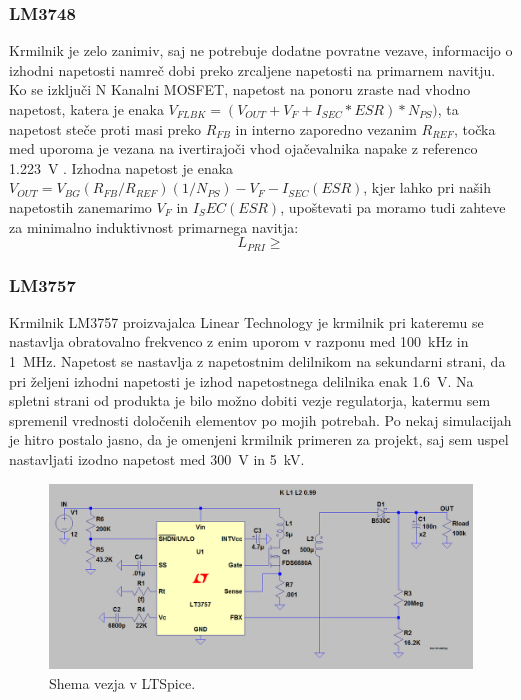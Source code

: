 \documentclass[a4paper,twoside,openright,12pt,slovene]{book}
\begin{document}
	\subsubsection{LM3748} \label{LM3748}
Krmilnik je zelo zanimiv, saj ne potrebuje dodatne povratne vezave, informacijo o izhodni napetosti namreč dobi preko zrcaljene napetosti na primarnem navitju. Ko se izključi N Kanalni MOSFET, napetost na ponoru zraste nad vhodno napetost, katera je enaka \(V_{FLBK} = (V_{OUT} + V_F + I_{SEC} * ESR) * N_{PS}) \), ta napetost steče proti masi preko \(R_{FB}\) in interno zaporedno vezanim \(R_{REF}\), točka med uporoma je vezana na ivertirajoči vhod ojačevalnika napake z referenco \SI{1.223}{\volt} \cite{analog:LT3748}. Izhodna napetost je enaka \(V_{OUT} = V_{BG}(R_{FB} / R_{REF})(1 / N_{PS}) - V_F - I_{SEC} (ESR)\), kjer lahko pri naših napetostih zanemarimo \(V_F\) in \(I_SEC (ESR)\), upoštevati pa moramo tudi zahteve za minimalno induktivnost primarnega navitja:
\[L_{PRI} \geq \]

	\subsubsection{LM3757} \label{LM3757}
Krmilnik LM3757 proizvajalca Linear Technology je krmilnik pri kateremu se nastavlja obratovalno frekvenco z enim uporom v razponu med \SI{100} {\kilo\hertz} in \SI{1} {\mega\hertz}. Napetost se nastavlja z napetostnim delilnikom na sekundarni strani, da pri željeni izhodni napetosti je izhod napetostnega delilnika enak \SI{1.6} {\volt}. Na spletni strani od produkta je bilo možno dobiti vezje regulatorja, katermu sem spremenil vrednosti določenih elementov po mojih potrebah. Po nekaj simulacijah je hitro postalo jasno, da je omenjeni krmilnik primeren za projekt, saj sem uspel nastavljati izodno napetost med \SI{300}{\volt} in \SI{5}{\kilo\volt}. 

    \begin{figure}[H]
        \centering
        \includegraphics[width=1\columnwidth]{Slike/Simulacije/LM3757spice.png}
        \caption{\label{LM3757spice} Shema vezja v LTSpice.}
    \end{figure}
    
\end{document}
